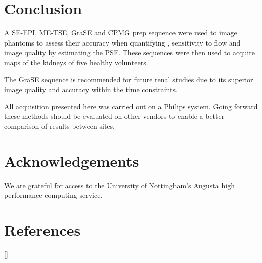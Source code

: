 \newpage

\section{Conclusion}

A \ac{SE}-\ac{EPI}, \ac{ME-TSE}, \ac{GraSE} and \ac{CPMG} \ttwo prep sequence were used to image phantoms to assess their accuracy when quantifying \ttwo, sensitivity to flow and image quality by estimating the \ac{PSF}. These sequences were then used to acquire \ttwo maps of the kidneys of five healthy volunteers.

The \ac{GraSE} sequence is recommended for future renal studies due to its superior image quality and accuracy within the time constraints.

All acquisition presented here was carried out on a Philips system. Going forward these methods should be evaluated on other vendors to enable a better comparison of results between sites.

\section{Acknowledgements}

We are grateful for access to the University of Nottingham's Augusta high performance computing service.

\newpage
\section{References}
[\refname]{}
\printbibliography